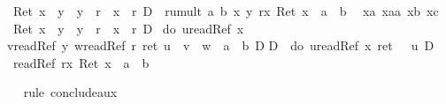\begin{isabellebody}
\begin{isamarkuptxt}
       \begin{isabelle}%
{\isasymturnstile}\ Ret\ {\isacharparenleft}x\ {\isasymnoteq}\ y\ {\isasymand}\ y\ {\isasymnoteq}\ r\ {\isasymand}\ x\ {\isasymnoteq}\ r{\isacharparenright}\ {\isasymlongrightarrow}\isactrlsub D\ {\isacharbrackleft}{\isacharhash}\ rumult\ a\ b\ x\ y\ r{\isacharbrackright}{\isacharparenleft}{\isasymlambda}x{\isachardot}\ Ret\ {\isacharparenleft}x\ {\isacharequal}\ a\ {\isacharasterisk}\ b{\isacharparenright}{\isacharparenright}\isanewline
\ {}{\isachardot}\ {\isasymAnd}xa\ xaa\ xb\ xc{\isachardot}\isanewline
{}\ {\isacharparenleft}Ret\ {\isacharparenleft}x\ {\isasymnoteq}\ y\ {\isasymand}\ y\ {\isasymnoteq}\ r\ {\isasymand}\ x\ {\isasymnoteq}\ r{\isacharparenright}\ {\isasymand}\isactrlsub D\isanewline
{}\ {\isacharparenleft}do\ {\isacharbraceleft}u{\isasymleftarrow}readRef\ x{\isacharsemicolon}\isanewline
{}v{\isasymleftarrow}readRef\ y{\isacharsemicolon}\ w{\isasymleftarrow}readRef\ r{\isacharsemicolon}\ ret\ {\isacharparenleft}u\ {\isacharasterisk}\ v\ {\isacharplus}\ w\ {\isacharequal}\ a\ {\isacharasterisk}\ b{\isacharparenright}{\isacharbraceright}{\isacharparenright}{\isacharparenright}\ {\isasymand}\isactrlsub D\isanewline
{}\isactrlsub D\ {\isasymUp}\ {\isacharparenleft}do\ {\isacharbraceleft}u{\isasymleftarrow}readRef\ x{\isacharsemicolon}\ ret\ {\isacharparenleft}{}\ {\isacharless}\ u{\isacharparenright}{\isacharbraceright}{\isacharparenright}\ {\isasymlongrightarrow}\isactrlsub D\isanewline
{}\ readRef\ r{\isacharbrackright}{\isacharparenleft}{\isasymlambda}x{\isachardot}\ Ret\ {\isacharparenleft}x\ {\isacharequal}\ a\ {\isacharasterisk}\ b{\isacharparenright}{\isacharparenright}%
\end{isabelle}%
\end{isamarkuptxt}%
\ \ \isamarkuptrue%
rule\ conclude{\isacharunderscore}aux{\isacharparenright}\ \ %
\isanewline
\isamarkupfalse%
\isanewline
\isanewline
\isanewline
\isamarkupfalse%
\isanewline
\isanewline
\isamarkupfalse%
\end{isabellebody}%

